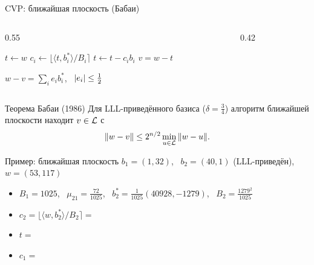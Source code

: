 \documentclass{ca-slides}
\begin{document}
\begin{canvasframe}{CVP: ближайшая плоскость (Бабаи)}
  \begin{columns}[T]
    \begin{column}{0.55\linewidth}
      \small
      \begin{algorithmic}[1]
        \State $t \gets w$
          \State $c_i \gets \lfloor \langle t, b_i^*\rangle / B_i \rceil$
          \State $t \gets t - c_i b_i$
        \EndFor
        \State \Return $v = w - t$
      \end{algorithmic}
      \medskip
      $w - v = \sum_i e_i b_i^*$, \ $\lvert e_i\rvert \le \tfrac12$
    \end{column}
    \begin{column}{0.42\linewidth}
      \centering
    \end{column}
  \end{columns}
\end{canvasframe}

\begin{theoremframe}{Теорема Бабаи (1986)}
  Для LLL-приведённого базиса ($\delta = \frac34$) алгоритм ближайшей плоскости находит
  $v \in \mathcal{L}$ с
  \[
    \|w - v\| \le 2^{n/2} \min_{u \in \mathcal{L}} \|w - u\|.
  \]
\end{theoremframe}

\begin{canvasframe}{Пример: ближайшая плоскость}
  $b_1 = (1, 32)$, \ $b_2 = (40, 1)$ (LLL-приведён), \ $w = (53, 117)$
  \begin{itemize}
    \item $B_1 = 1025$, \ $\mu_{21} = \tfrac{72}{1025}$, \
      $b_2^* = \tfrac{1}{1025}(40928, -1279)$, \ $B_2 = \tfrac{1279^2}{1025}$
    \item $c_2 = \lfloor \langle w, b_2^* \rangle / B_2 \rceil = $
    \item $t = $
    \item $c_1 = $
  \end{itemize}
  \notearea[0.3\textheight]
\end{canvasframe}
\end{document}
